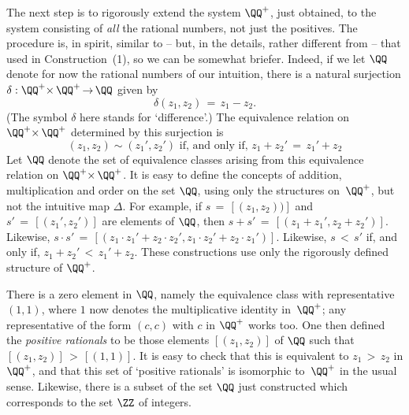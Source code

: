  \V

        The next step is to rigorously extend the system ${\QQ}^{+}$, just obtained,
    to the system consisting of {\em all} the rational numbers, not just the positives.
    The procedure is, in spirit, similar to -- but, in the details, rather different from -- that used in Construction~(1), so we can be somewhat briefer.
    Indeed, if we let ${\QQ}$ denote for now the rational numbers of our intuition,
    there is a natural surjection ${\delta}:{\QQ}^{+}{\times}\,{\QQ}^{+}  \,{\rightarrow}\,  {\QQ}$ given by
        \begin{displaymath}
        {\delta}(z_{1},z_{2}) \,=\, z_{1} - z_{2}.
        \end{displaymath}
    (The symbol ${\delta}$ here stands for `difference'.) The equivalence relation on ${\QQ}^{+}{\times}\,{\QQ}^{+}$ determined by this surjection is
        \begin{displaymath}
        (z_{1},z_{2}){\sim}(z_{1}',z_{2}') \mbox{ if, and only if, }
        z_{1} + z_{2}' \,=\, z_{1}' + z_{2}
        \end{displaymath}
    Let ${\QQ}$ denote the set of equivalence classes arising from this equivalence relation on ${\QQ}^{+}{\times}\,{\QQ}^{+}$.
    It is easy to define the concepts of addition, multiplication and order on the set ${\QQ}$,
    using only the structures on~${\QQ}^{+}$, but not the intuitive map ${\Delta}$.
    For example, if $s \,=\, [(z_{1},z_{2}))]$ and $s' \,=\, [(z_{1}',z_{2}')]$ are elements of ${\QQ}$,
    then $s+s' \,=\, [(z_{1} + z_{1}', z_{2} + z_{2}')]$. Likewise, $s{\cdot}s' \,=\, [(z_{1}{\cdot}z_{1}' + z_{2}{\cdot}z_{2}', z_{1}{\cdot}z_{2}' + z_{2}{\cdot}z_{1}')]$.
    Likewise, $s\,<\,s'$ if, and only if, $z_{1} + z_{2}'\,<\,z_{1}' + z_{2}$. These constructions use only the rigorously defined structure of ${\QQ}^{+}$.

        There is a zero element in ${\QQ}$, namely the equivalence class with representative $(1,1)$,
    where $1$ now denotes the multiplicative identity in~${\QQ}^{+}$; any representative of the form $(c,c)$ with $c$ in ${\QQ}^{+}$ works too.
    One then defined the {\em positive rationals} to be those elements $[(z_{1},z_{2})]$ of ${\QQ}$ such that $[(z_{1},z_{2})]\,>\,[(1,1)]$.
    It is easy to check that this is equivalent to $z_{1}\,>\,z_{2}$ in ${\QQ}^{+}$,
    and that this set of `positive rationals' is isomorphic to~${\QQ}^{+}$ in the usual sense.
    Likewise, there is a subset of the set ${\QQ}$ just constructed which corresponds to the set ${\ZZ}$ of integers.

